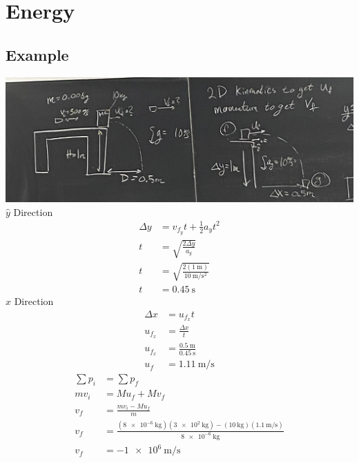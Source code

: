 \documentclass{article}
\begin{document}
\newcommand{\hr}{\par\noindent\rule{\textwidth}{0.4pt}}

\newcommand{\bc}[1]{
	\begin{equation*}
		\begin{boxed}
			{#1}
		\end{boxed}
	\end{equation*}
}

\newcommand{\cond}[2]{
	\ifmmode
		{#1} \quad {#2}
	\else
		$$ {#1} \quad {#2} $$
	\fi
}

\tableofcontents

\section{Energy}

\subsection{Example}

\includegraphics[width = \linewidth]{example_1.jpg}
$ \hat{y} $ Direction
\begin{align*}
	\Delta y & = v_{f_y}t + \frac{1}{2}a_yt^2 \\
	t & = \sqrt{ \frac{2\Delta y}{a_y} } \\
	t & = \sqrt{ \frac{2(\SI{1}{\meter})}{\SI{10}{\meter \per \second \squared}} } \\
	t & = \SI{0.45}{\second}
\end{align*}
$ \hat{x} $ Direction
\begin{align*}
	\Delta x & = u_{f_x}t \\
	u_{f_x} & = \frac{\Delta x}{t} \\
	u_{f_x} & = \frac{\SI{0.5}{\meter}}{\SI{0.45}{\second}} \\
	u_f & = \SI{1.11}{\meter \per \second}
\end{align*}
\begin{align*}
	\sum p_i & = \sum p_f \\
	mv_i & = Mu_f + Mv_f \\
	v_f & = \frac{mv_i - Mu_f}{m} \\
	v_f & = \frac{(\SI{8e-6}{\kilogram})(\SI{3e2}{\kilogram}) - (\SI{10}{\kilogram})(\SI{1.1}{\meter \per \second})}{\SI{8e-6}{\kilogram}} \\
	v_f & = -\SI{1e6}{\meter \per \second}
\end{align*}
\end{document}
